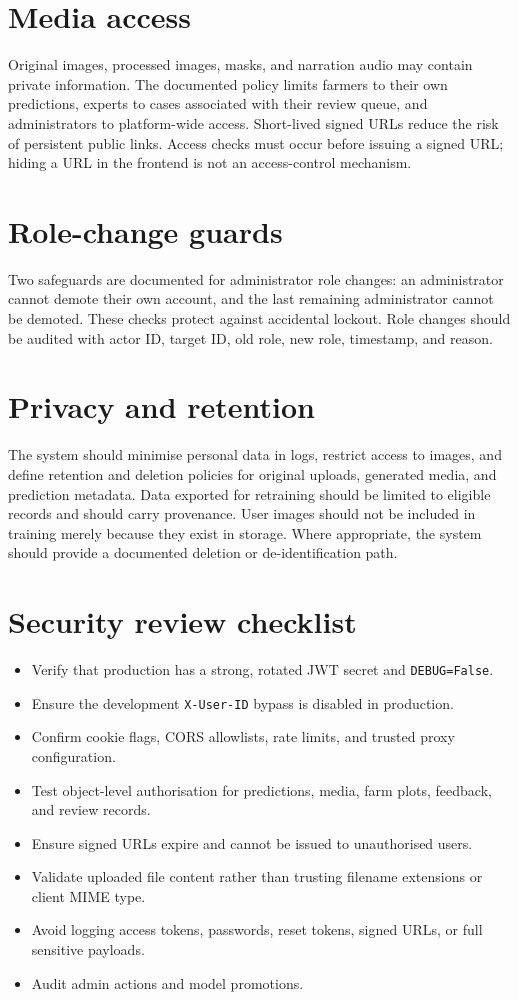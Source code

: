 \documentclass[12pt,a4paper,oneside,openany]{report}
\begin{document}
\section{Media access}
Original images, processed images, masks, and narration audio may contain private information. The documented policy limits farmers to their own predictions, experts to cases associated with their review queue, and administrators to platform-wide access. Short-lived signed URLs reduce the risk of persistent public links. Access checks must occur before issuing a signed URL; hiding a URL in the frontend is not an access-control mechanism.

\section{Role-change guards}
Two safeguards are documented for administrator role changes: an administrator cannot demote their own account, and the last remaining administrator cannot be demoted. These checks protect against accidental lockout. Role changes should be audited with actor ID, target ID, old role, new role, timestamp, and reason.

\section{Privacy and retention}
The system should minimise personal data in logs, restrict access to images, and define retention and deletion policies for original uploads, generated media, and prediction metadata. Data exported for retraining should be limited to eligible records and should carry provenance. User images should not be included in training merely because they exist in storage. Where appropriate, the system should provide a documented deletion or de-identification path.

\section{Security review checklist}
\begin{itemize}[topsep=2pt,itemsep=1.5pt,parsep=0pt,partopsep=0pt]
\item Verify that production has a strong, rotated JWT secret and \texttt{DEBUG=False}.
\item Ensure the development \texttt{X-User-ID} bypass is disabled in production.
\item Confirm cookie flags, CORS allowlists, rate limits, and trusted proxy configuration.
\item Test object-level authorisation for predictions, media, farm plots, feedback, and review records.
\item Ensure signed URLs expire and cannot be issued to unauthorised users.
\item Validate uploaded file content rather than trusting filename extensions or client MIME type.
\item Avoid logging access tokens, passwords, reset tokens, signed URLs, or full sensitive payloads.
\item Audit admin actions and model promotions.
\end{itemize}
\end{document}
